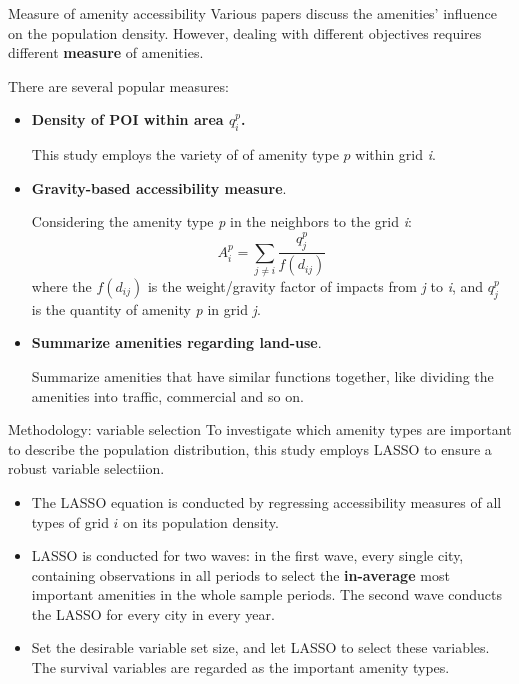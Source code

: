 \documentclass[aspectratio=169,xcolor=dvipsnames]{beamer}
\begin{document}
\begin{frame}{Measure of amenity accessibility}
	Various papers discuss the amenities' influence on the population density. However, dealing with different objectives requires different \textbf{measure} of amenities.\par 
	There are several popular measures:
	\begin{itemize}
		\item \textbf{Density of POI within area $q^p_{i}$.}\par 
		{\small This study employs the variety of of amenity type $p$ within grid \textit{i}}.
		\item \textbf{Gravity-based accessibility measure}.\par 
		{\small Considering the amenity type \textit{p} in the neighbors to the grid \textit{i}:}
		\begin{equation}
			A_i^p=\sum_{j\neq i}\frac{q_j^p}{f(d_{ij})}
		\end{equation}where the $f(d_{ij})$ is the weight/gravity factor of impacts from \textit{j} to \textit{i}, and $q^p_{j}$ is the quantity of amenity \textit{p} in grid \textit{j}. 
		\item \textbf{Summarize amenities regarding land-use}. \par 
		{\small Summarize amenities that have similar functions together, like dividing the amenities into traffic, commercial and so on.}
	\end{itemize}
\end{frame}

\begin{frame}{Methodology: variable selection}
	To investigate which amenity types are important to describe the population distribution, this study employs LASSO to ensure a robust variable selectiion.
	\par 
		\begin{itemize}
			\item The LASSO equation is conducted by regressing accessibility measures of all types of grid $i$ on its population density.
			\item LASSO is conducted for two waves: in the first wave, every single city, containing observations in all periods to select the \textbf{in-average} most important amenities in the whole sample periods. The second wave conducts the LASSO for every city in every year.
			\item Set the desirable variable set size, and let LASSO to select these variables. The survival variables are regarded as the important amenity types.
		\end{itemize}
\end{frame}
\end{document}

